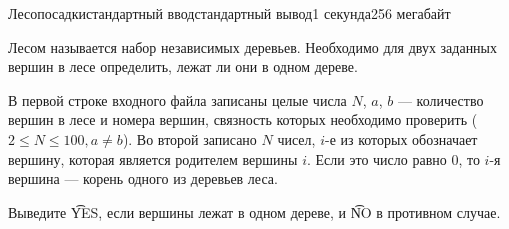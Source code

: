 \begin{problem}{Лесопосадки}{стандартный ввод}{стандартный вывод}{1 секунда}{256 мегабайт}

Лесом называется набор независимых деревьев. Необходимо для двух заданных вершин в лесе определить, лежат ли они в одном дереве.

\InputFile
В первой строке входного файла записаны целые числа $N$, $a$, $b$ --- количество вершин в лесе и номера вершин, связность которых необходимо проверить ($2 \le N \le 100, a \ne b$).
Во второй записано $N$ чисел, $i$-е из которых обозначает вершину, которая является родителем вершины $i$. Если это число равно 0, то $i$-я вершина --- корень одного из деревьев леса.

\OutputFile
Выведите \t{YES}, если вершины лежат в одном дереве, и \t{NO} в противном случае.

\Examples

\begin{example}
%
%
\end{example}

\end{problem}

